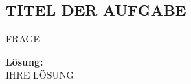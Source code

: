 \documentclass[11pt,a4paper,DIV=12]{scrartcl}
\date{\today}
\author{Max Mustermann\\ (1992822)}
\newcommand{\loesung}{\textbf{Lösung:}\\}
\begin{document}
\maketitle       %

\subsection{TITEL DER AUFGABE}

FRAGE

\loesung
IHRE LÖSUNG

\end{document}
